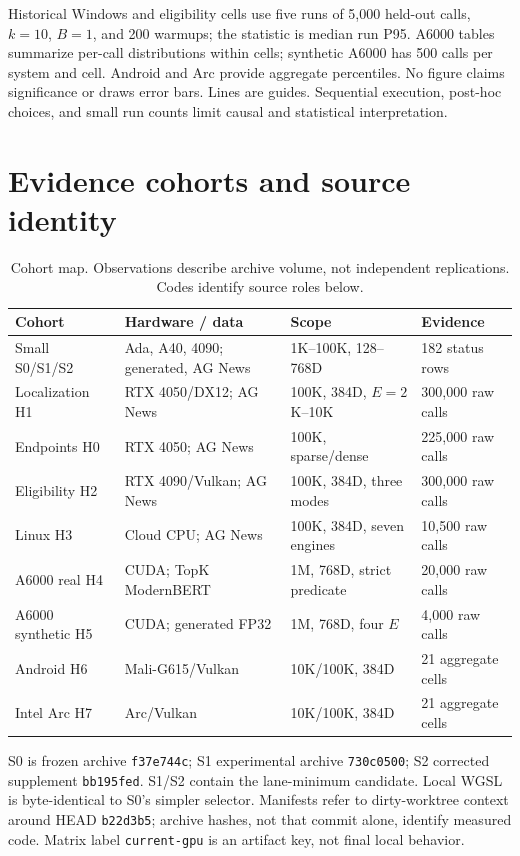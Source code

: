 \documentclass[10pt]{article}
\begin{document}
Historical Windows and eligibility cells use five runs of 5,000 held-out calls, $k=10$, $B=1$, and 200 warmups; the statistic is median run P95. A6000 tables summarize per-call distributions within cells; synthetic A6000 has 500 calls per system and cell. Android and Arc provide aggregate percentiles. No figure claims significance or draws error bars. Lines are guides. Sequential execution, post-hoc choices, and small run counts limit causal and statistical interpretation.

\section{Evidence cohorts and source identity}\label{sec:cohorts}
\begin{table}[H]\centering\small
\caption{Cohort map. Observations describe archive volume, not independent replications. Codes identify source roles below.}
\begin{tabular}{p{.24\linewidth}p{.23\linewidth}p{.22\linewidth}p{.19\linewidth}}
\toprule Cohort & Hardware / data & Scope & Evidence \\
\midrule
Small S0/S1/S2 & Ada, A40, 4090; generated, AG News & 1K--100K, 128--768D & 182 status rows \\
Localization H1 & RTX 4050/DX12; AG News & 100K, 384D, $E=2$K--10K & 300,000 raw calls \\
Endpoints H0 & RTX 4050; AG News & 100K, sparse/dense & 225,000 raw calls \\
Eligibility H2 & RTX 4090/Vulkan; AG News & 100K, 384D, three modes & 300,000 raw calls \\
Linux H3 & Cloud CPU; AG News & 100K, 384D, seven engines & 10,500 raw calls \\
A6000 real H4 & CUDA; TopK ModernBERT & 1M, 768D, strict predicate & 20,000 raw calls \\
A6000 synthetic H5 & CUDA; generated FP32 & 1M, 768D, four $E$ & 4,000 raw calls \\
Android H6 & Mali-G615/Vulkan & 10K/100K, 384D & 21 aggregate cells \\
Intel Arc H7 & Arc/Vulkan & 10K/100K, 384D & 21 aggregate cells \\
\bottomrule\end{tabular}\end{table}
S0 is frozen archive \texttt{f37e744c}; S1 experimental archive \texttt{730c0500}; S2 corrected supplement \texttt{bb195fed}. S1/S2 contain the lane-minimum candidate. Local WGSL is byte-identical to S0's simpler selector. Manifests refer to dirty-worktree context around HEAD \texttt{b22d3b5}; archive hashes, not that commit alone, identify measured code. Matrix label \texttt{current-gpu} is an artifact key, not final local behavior.
\end{document}
